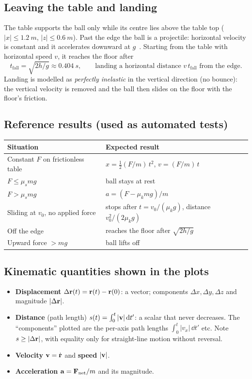 \documentclass[11pt]{article}
\begin{document}
\subsection{Leaving the table and landing}
The table supports the ball only while its centre lies above the table top
($|x|\le \SI{1.2}{m}$, $|z|\le\SI{0.6}{m}$). Past the edge the ball is a projectile: horizontal
velocity is constant and it accelerates downward at $g$~\cite{taylor2005}. Starting from the
table with horizontal speed $v$, it reaches the floor after
\begin{equation}
  t_\text{fall} = \sqrt{2h/g} \approx \SI{0.404}{s}, \qquad \text{landing a horizontal distance } v\,t_\text{fall}\text{ from the edge.}
\end{equation}
Landing is modelled as \emph{perfectly inelastic} in the vertical direction (no bounce): the
vertical velocity is removed and the ball then slides on the floor with the floor's friction.

\subsection{Reference results (used as automated tests)}
\begin{center}
\begin{tabular}{@{}ll@{}}
\toprule
Situation & Expected result \\ \midrule
Constant $F$ on frictionless table & $x = \tfrac12 (F/m)\, t^2$, $v = (F/m)\,t$ \\
$F \le \mu_s m g$ & ball stays at rest \\
$F > \mu_s m g$ & $a = (F - \mu_k m g)/m$ \\
Sliding at $v_0$, no applied force & stops after $t = v_0/(\mu_k g)$, distance $v_0^2/(2\mu_k g)$ \\
Off the edge & reaches the floor after $\sqrt{2h/g}$ \\
Upward force $> mg$ & ball lifts off \\ \bottomrule
\end{tabular}
\end{center}

\subsection{Kinematic quantities shown in the plots}
\begin{itemize}
  \item \textbf{Displacement} $\Delta\mathbf{r}(t) = \mathbf{r}(t)-\mathbf{r}(0)$: a vector; components $\Delta x,\Delta y,\Delta z$ and magnitude $|\Delta\mathbf{r}|$.
  \item \textbf{Distance} (path length) $s(t) = \int_0^t |\mathbf{v}|\,\mathrm{d} t'$: a scalar that never decreases.
        The ``components'' plotted are the per-axis path lengths $\int_0^t |v_x|\,\dd t'$ etc.
        Note $s \ge |\Delta\mathbf{r}|$, with equality only for straight-line motion without reversal.
  \item \textbf{Velocity} $\mathbf{v} = \dot{\mathbf{r}}$ and \textbf{speed} $|\mathbf{v}|$.
  \item \textbf{Acceleration} $\mathbf{a} = \mathbf{F}_\text{net}/m$ and its magnitude.
\end{itemize}
\end{document}
